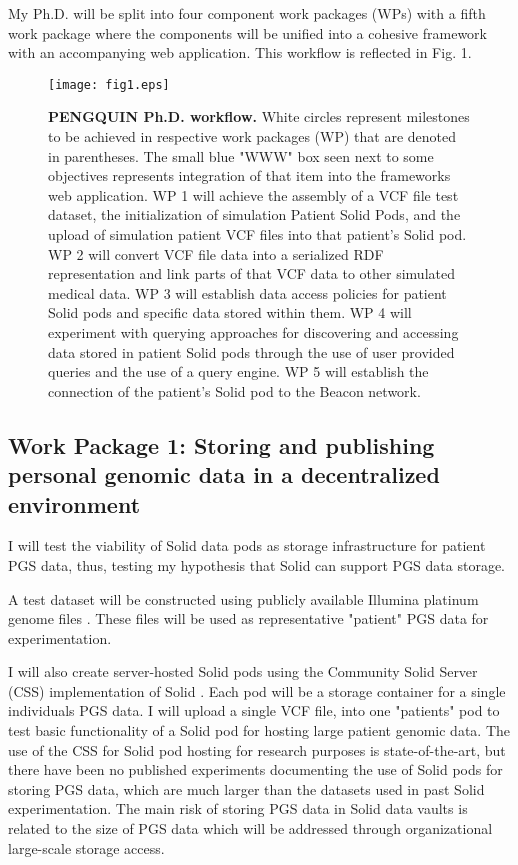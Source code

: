 \documentclass[runningheads]{llncs}
\begin{document}
My Ph.D. will be split into four component work packages (WPs) with a fifth work package where the components will be unified into a cohesive framework with an accompanying web application. This workflow is reflected in Fig. 1.

\begin{figure}
\texttt{[image: fig1.eps]}
\caption{\textbf{PENGQUIN Ph.D. workflow.}
White circles represent milestones to be achieved in respective work packages (WP) that are denoted in parentheses. 
The small blue "WWW" box seen next to some objectives represents integration of that item into the framework\textquotesingle s web application.
WP 1 will achieve the assembly of a VCF file test dataset, the initialization of simulation Patient Solid Pods, and the upload of simulation patient VCF files into that patient's Solid pod.
WP 2 will convert VCF file data into a serialized RDF representation and link parts of that VCF data to other simulated medical data.
WP 3 will establish data access policies for patient Solid pods and specific data stored within them.
WP 4 will experiment with querying approaches for discovering and accessing data stored in patient Solid pods through the use of user provided queries and the use of a query engine.
WP 5 will establish the connection of the patient's Solid pod to the Beacon network.
} \label{fig1}
\end{figure}

\begin{comment}
1. Research question --> how to answer
2. how do you plan to test hypothesis
3. how is the approach novel / how it is implemented
\end{comment}

\subsection{Work Package 1: Storing and publishing personal genomic data in a decentralized environment} 

I will test the viability of Solid data pods as storage infrastructure for patient PGS data, thus, testing my hypothesis that Solid can support PGS data storage. 

A test dataset will be constructed using publicly available Illumina platinum genome files \cite{noauthor_platinum_nodate}. 
These files will be used as representative "patient" PGS data for experimentation. 

I will also create server-hosted Solid pods using the Community Solid Server (CSS) implementation of Solid \cite{css}. 
Each pod will be a storage container for a single individual\textquotesingle s PGS data. 
I will upload a single VCF file, into one "patient\textquotesingle s" pod to test basic functionality of a Solid pod for hosting large patient genomic data. 
The use of the CSS for Solid pod hosting for research purposes is state-of-the-art, but there have been no published experiments documenting the use of Solid pods for storing PGS data, which are much larger than the datasets used in past Solid experimentation. 
The main risk of storing PGS data in Solid data vaults is related to the size of PGS data which will be addressed through organizational large-scale storage access. 
\end{document}
